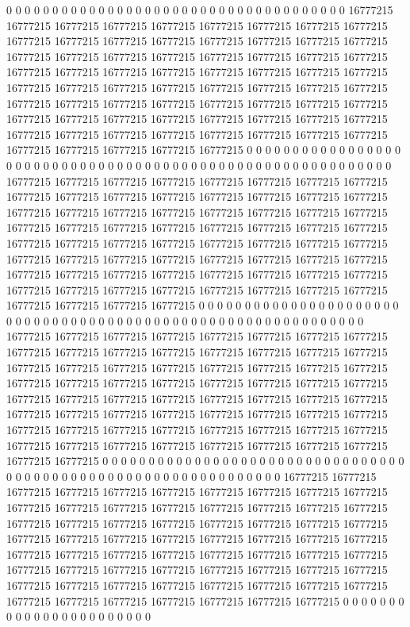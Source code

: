 0 0 0 0 0 0 0 0 0 0 0 0 0 0 0 0 0 0 0 0 0 0 0 0 0 0 0 0 0 0 0 0 0 0 0 0 0 16777215 16777215 16777215 16777215 16777215 16777215 16777215 16777215 16777215 16777215 16777215 16777215 16777215 16777215 16777215 16777215 16777215 16777215 16777215 16777215 16777215 16777215 16777215 16777215 16777215 16777215 16777215 16777215 16777215 16777215 16777215 16777215 16777215 16777215 16777215 16777215 16777215 16777215 16777215 16777215 16777215 16777215 16777215 16777215 16777215 16777215 16777215 16777215 16777215 16777215 16777215 16777215 16777215 16777215 16777215 16777215 16777215 16777215 16777215 16777215 16777215 16777215 16777215 16777215 16777215 16777215 16777215 16777215 16777215 16777215 0 0 0 0 0 0 0 0 0 0 0 0 0 0 0 0 0 0 0 0 0
0 0 0 0 0 0 0 0 0 0 0 0 0 0 0 0 0 0 0 0 0 0 0 0 0 0 0 0 0 0 0 0 0 0 0 0 0 0 16777215 16777215 16777215 16777215 16777215 16777215 16777215 16777215 16777215 16777215 16777215 16777215 16777215 16777215 16777215 16777215 16777215 16777215 16777215 16777215 16777215 16777215 16777215 16777215 16777215 16777215 16777215 16777215 16777215 16777215 16777215 16777215 16777215 16777215 16777215 16777215 16777215 16777215 16777215 16777215 16777215 16777215 16777215 16777215 16777215 16777215 16777215 16777215 16777215 16777215 16777215 16777215 16777215 16777215 16777215 16777215 16777215 16777215 16777215 16777215 16777215 16777215 16777215 16777215 16777215 16777215 16777215 16777215 0 0 0 0 0 0 0 0 0 0 0 0 0 0 0 0 0 0 0 0 0 0
0 0 0 0 0 0 0 0 0 0 0 0 0 0 0 0 0 0 0 0 0 0 0 0 0 0 0 0 0 0 0 0 0 0 0 0 0 0 0 16777215 16777215 16777215 16777215 16777215 16777215 16777215 16777215 16777215 16777215 16777215 16777215 16777215 16777215 16777215 16777215 16777215 16777215 16777215 16777215 16777215 16777215 16777215 16777215 16777215 16777215 16777215 16777215 16777215 16777215 16777215 16777215 16777215 16777215 16777215 16777215 16777215 16777215 16777215 16777215 16777215 16777215 16777215 16777215 16777215 16777215 16777215 16777215 16777215 16777215 16777215 16777215 16777215 16777215 16777215 16777215 16777215 16777215 16777215 16777215 16777215 16777215 16777215 16777215 16777215 16777215 0 0 0 0 0 0 0 0 0 0 0 0 0 0 0 0 0 0 0 0 0 0 0
0 0 0 0 0 0 0 0 0 0 0 0 0 0 0 0 0 0 0 0 0 0 0 0 0 0 0 0 0 0 0 0 0 0 0 0 0 0 0 0 16777215 16777215 16777215 16777215 16777215 16777215 16777215 16777215 16777215 16777215 16777215 16777215 16777215 16777215 16777215 16777215 16777215 16777215 16777215 16777215 16777215 16777215 16777215 16777215 16777215 16777215 16777215 16777215 16777215 16777215 16777215 16777215 16777215 16777215 16777215 16777215 16777215 16777215 16777215 16777215 16777215 16777215 16777215 16777215 16777215 16777215 16777215 16777215 16777215 16777215 16777215 16777215 16777215 16777215 16777215 16777215 16777215 16777215 16777215 16777215 16777215 16777215 16777215 16777215 16777215 0 0 0 0 0 0 0 0 0 0 0 0 0 0 0 0 0 0 0 0 0 0 0
